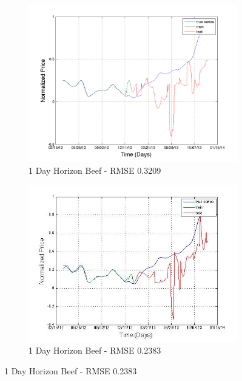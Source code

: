 \begin{figure}[H]
        \begin{subfigure}[b]{0.5\textwidth}
                \includegraphics[width=\textwidth]{img/model/exp2/beef/pred_1}
                \caption{1 Day Horizon Beef - RMSE 0.3209  }
                \label{fig:tiger}
        \end{subfigure}%
              \begin{subfigure}[b]{0.5\textwidth}
                \includegraphics[width=\textwidth]{img/model/exp2_final/beef_1}
                \caption{1 Day Horizon Beef  - RMSE 0.2383 }
                \label{fig:tiger}
        \end{subfigure}%
        \end{figure}
        
